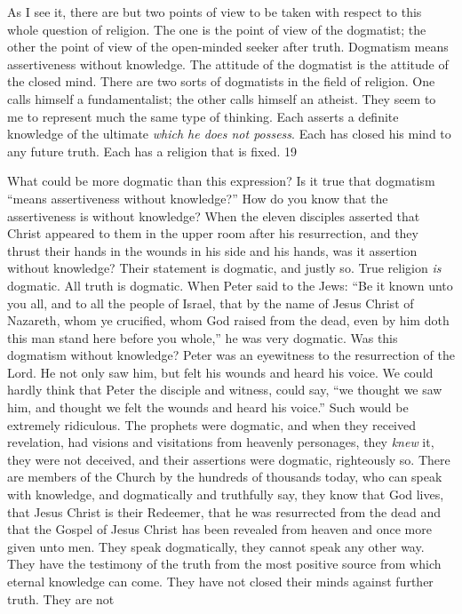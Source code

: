 As I see it, there are but two points of view to be taken with respect to this whole question of
religion. The one is the point of view of the dogmatist; the other the point of view of the
open-minded seeker after truth. Dogmatism means assertiveness without knowledge. The
attitude of the dogmatist is the attitude of the closed mind. There are two sorts of dogmatists
in the field of religion. One calls himself a fundamentalist; the other calls himself an atheist.
They seem to me to represent much the same type of thinking. Each asserts a definite
knowledge of the ultimate \textit{which he does not possess}. Each has closed his mind to any future
truth. Each has a religion that is fixed. 19

What could be more dogmatic than this expression? Is it true that dogmatism ``means
assertiveness without knowledge?'' How do you know that the assertiveness is without
knowledge? When the eleven disciples asserted that Christ appeared to them in the upper
room after his resurrection, and they thrust their hands in the wounds in his side and his
hands, was it assertion without knowledge? Their statement is dogmatic, and justly so. True
religion \textit{is} dogmatic. All truth is dogmatic. When Peter said to the Jews: ``Be it known unto
you all, and to all the people of Israel, that by the name of Jesus Christ of Nazareth, whom ye
crucified, whom God raised from the dead, even by him doth this man stand here before you
whole,'' he was very dogmatic. Was this dogmatism without knowledge? Peter was an
eyewitness to the resurrection of the Lord. He not only saw him, but felt his wounds and
heard his voice. We could hardly think that Peter the disciple and witness, could say, ``we
thought we saw him, and thought we felt the wounds and heard his voice.'' Such would be
extremely ridiculous. The prophets were dogmatic, and when they received revelation, had
visions and visitations from heavenly personages, they \textit{knew} it, they were not deceived, and
their assertions were dogmatic, righteously so. There are members of the Church by the
hundreds of thousands today, who can speak with knowledge, and dogmatically and
truthfully say, they know that God lives, that Jesus Christ is their Redeemer, that he was
resurrected from the dead and that the Gospel of Jesus Christ has been revealed from heaven
and once more given unto men. They speak dogmatically, they cannot speak any other way.
They have the testimony of the truth from the most positive source from which eternal
knowledge can come. They have not closed their minds against further truth. They are not
